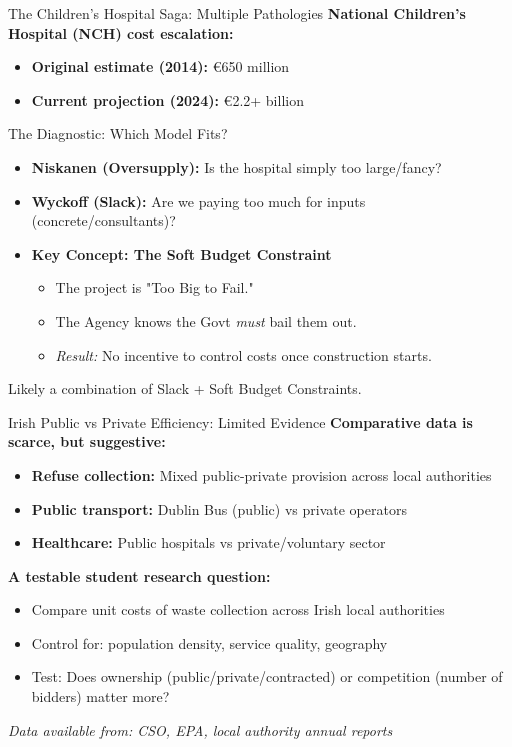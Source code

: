\documentclass[10pt]{beamer}
\begin{document}
\begin{frame}{The Children's Hospital Saga: Multiple Pathologies}
\textbf{National Children's Hospital (NCH) cost escalation:}
\begin{itemize}
\item \textbf{Original estimate (2014):} €650 million
\item \textbf{Current projection (2024):} €2.2+ billion
\end{itemize}

\vspace{0.3cm}

\begin{block}{The Diagnostic: Which Model Fits?}
\small
\begin{itemize}
\item \textbf{Niskanen (Oversupply):} Is the hospital simply too large/fancy?
\item \textbf{Wyckoff (Slack):} Are we paying too much for inputs (concrete/consultants)?
\item \textbf{Key Concept: The Soft Budget Constraint}
\begin{itemize}
\item The project is "Too Big to Fail."
\item The Agency knows the Govt \emph{must} bail them out.
\item \emph{Result:} No incentive to control costs once construction starts.
\end{itemize}
\end{itemize}
\end{block}

\centering
\alert{Likely a combination of Slack + Soft Budget Constraints.}
\end{frame}


\begin{frame}{Irish Public vs Private Efficiency: Limited Evidence}
\textbf{Comparative data is scarce, but suggestive:}

\begin{itemize}
\item \textbf{Refuse collection:} Mixed public-private provision across local authorities
\item \textbf{Public transport:} Dublin Bus (public) vs private operators
\item \textbf{Healthcare:} Public hospitals vs private/voluntary sector
\end{itemize}


\textbf{A testable student research question:}
\begin{itemize}
\item Compare unit costs of waste collection across Irish local authorities
\item Control for: population density, service quality, geography
\item Test: Does ownership (public/private/contracted) or competition (number of bidders) matter more?
\end{itemize}


\footnotesize
\textit{Data available from: CSO, EPA, local authority annual reports}
\end{frame}
\end{document}
